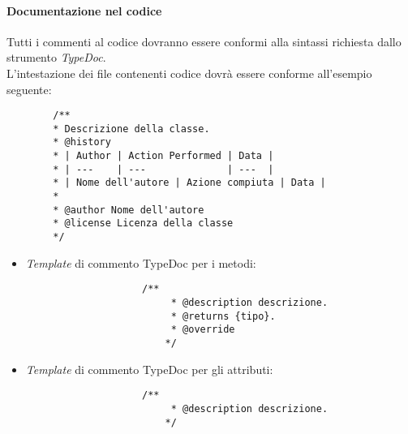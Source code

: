 		\paragraph*{Documentazione nel codice}
		Tutti i commenti al codice dovranno essere conformi alla sintassi richiesta dallo strumento \textit{TypeDoc}. \\
		L'intestazione dei file contenenti codice dovrà essere conforme all'esempio seguente:
		\begin{lstlisting}
		/**
 		* Descrizione della classe.
 		* @history
 		* | Author | Action Performed | Data |
 		* | ---    | ---              | ---  |
 		* | Nome dell'autore | Azione compiuta | Data |
 		*
 		* @author Nome dell'autore
 		* @license Licenza della classe
 		*/
		\end{lstlisting}
		\begin{itemize}
			\item \textit{Template} di commento TypeDoc per i metodi:
				\begin{lstlisting}
					/**
    					 * @description descrizione.
     					 * @returns {tipo}.
  				         * @override
     					*/
				\end{lstlisting}
			\item \textit{Template} di commento TypeDoc per gli attributi:
				\begin{lstlisting}
					/**
    					 * @description descrizione.
     					*/
				\end{lstlisting}
		\end{itemize}
	
